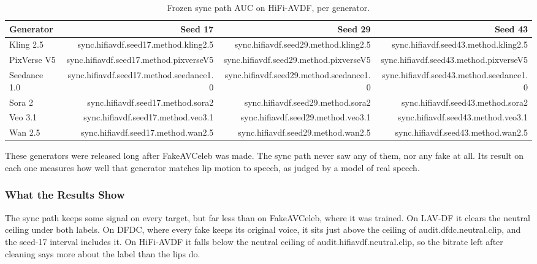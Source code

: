 \begin{table}[ht]
    \centering
    \small
    \caption{Frozen sync path AUC on HiFi-AVDF, per generator.}
    \label{tab:hifi-generators}
    \begin{tabular}{l r r r}
        \toprule
        \textbf{Generator} & \textbf{Seed 17} & \textbf{Seed 29} & \textbf{Seed 43} \\
        \midrule
        Kling 2.5    & {{sync.hifiavdf.seed17.method.kling2.5}} & {{sync.hifiavdf.seed29.method.kling2.5}} & {{sync.hifiavdf.seed43.method.kling2.5}} \\
        PixVerse V5  & {{sync.hifiavdf.seed17.method.pixverseV5}} & {{sync.hifiavdf.seed29.method.pixverseV5}} & {{sync.hifiavdf.seed43.method.pixverseV5}} \\
        Seedance 1.0 & {{sync.hifiavdf.seed17.method.seedance1.0}} & {{sync.hifiavdf.seed29.method.seedance1.0}} & {{sync.hifiavdf.seed43.method.seedance1.0}} \\
        Sora 2       & {{sync.hifiavdf.seed17.method.sora2}} & {{sync.hifiavdf.seed29.method.sora2}} & {{sync.hifiavdf.seed43.method.sora2}} \\
        Veo 3.1      & {{sync.hifiavdf.seed17.method.veo3.1}} & {{sync.hifiavdf.seed29.method.veo3.1}} & {{sync.hifiavdf.seed43.method.veo3.1}} \\
        Wan 2.5      & {{sync.hifiavdf.seed17.method.wan2.5}} & {{sync.hifiavdf.seed29.method.wan2.5}} & {{sync.hifiavdf.seed43.method.wan2.5}} \\
        \bottomrule
    \end{tabular}
\end{table}

These generators were released long after FakeAVCeleb was made. The sync path
never saw any of them, nor any fake at all. Its result on each one measures
how well that generator matches lip motion to speech, as judged by a model of
real speech.

\subsubsection{What the Results Show}

The sync path keeps some signal on every target, but far less than on
FakeAVCeleb, where it was trained. On LAV-DF it clears the neutral ceiling
under both labels. On DFDC, where every fake keeps its original voice, it sits
just above the ceiling of {{audit.dfdc.neutral.clip}}, and the seed-17
interval includes it. On HiFi-AVDF it falls
below the neutral ceiling of {{audit.hifiavdf.neutral.clip}}, so the bitrate
left after cleaning says more about the label than the lips do.

